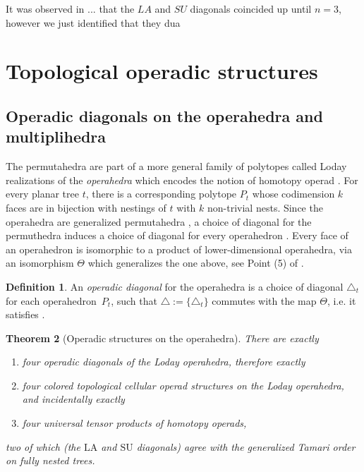 \documentclass{amsart}
\newtheorem{theorem}{Theorem}[section]
\theoremstyle{definition}
\newtheorem{definition}[theorem]{Definition}
\newcommand{\SU}{\mathrm{SU}}
\newcommand{\LA}{\mathrm{LA}}
\begin{document}
It was observed in ... that the $LA$ and $SU$ diagonals coincided up until $n=3$, however we just identified that they dua


\section{Topological operadic structures}


\subsection{Operadic diagonals on the operahedra and multiplihedra}

The permutahedra are part of a more general family of polytopes called Loday realizations of the \emph{operahedra} \cite[Def. 2.9]{LA21} which encodes the notion of homotopy operad \cite[Def. 4.11]{LA21}.
For every planar tree $t$, there is a corresponding polytope $P_t$ whose codimension $k$ faces are in bijection with nestings of $t$ with $k$ non-trivial nests.
Since the operahedra are generalized permutahedra \cite[Cor. 2.16]{LA21}, a choice of diagonal for the permuthedra induces a choice of diagonal for every operahedron \cite[Cor. 1.31]{LA21}.
Every face of an operahedron is isomorphic to a product of lower-dimensional operahedra, via an isomorphism $\Theta$ which generalizes the one above, see Point (5) of \cite[Prop. 2.3]{LA21}.

\begin{definition}
    An \emph{operadic diagonal} for the operahedra is a choice of diagonal $\triangle_t$ for each operahedron~$P_t$, such that $\triangle:=\{\triangle_t\}$ commutes with the map $\Theta$, i.e. it satisfies \cite[Prop. 4.14]{LA21}.
\end{definition}

\begin{theorem}[Operadic structures on the operahedra] 
    \label{thm:operahedra}
There are exactly 
\begin{enumerate}
    \item four operadic diagonals of the Loday operahedra, therefore exactly
    \item four colored topological cellular operad structures on the Loday operahedra, and incidentally exactly
    \item four universal tensor products of homotopy operads,
\end{enumerate}
two of which (the $\LA$ and $\SU$ diagonals) agree with the generalized Tamari order on fully nested trees. 
\end{theorem}
\end{document}
